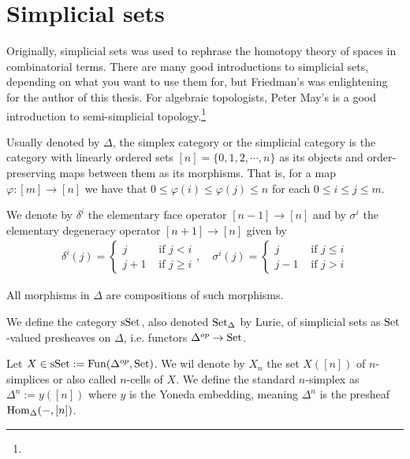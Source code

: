 \documentclass[../../thesis.tex]{subfiles}
\begin{document}
\section{Simplicial sets}
Originally, simplicial sets was used to rephrase the homotopy theory of spaces in combinatorial terms.
There are many good introductions to simplicial sets, depending on what you want to use them for, but Friedman's \cite{friedman2021elementary} was enlightening for the author of this thesis.
For algebraic topologists, Peter May's \cite{MAY} is a good introduction to semi-simplicial topology.\footnote{}
\begin{definition}
    Usually denoted by $\Delta$, the simplex category or the simplicial category is the category with linearly ordered sets $[n]=\{0,1,2,\cdots ,n\}$ as its objects and order-preserving maps between them as its morphisms.
    That is, for a map $\varphi:[m] \to [n]$ we have that $0 \leq \varphi(i)\leq \varphi(j)\leq n$ for each $0 \leq i \leq j \leq m$.
\end{definition}
We denote by $\delta^i$ the elementary face operator $[n-1] \to [n]$ and by $\sigma^i$ the elementary degeneracy operator $[n+1] \to [n]$ given by
\[
    \begin{aligned}
        \delta^i(j) =
        \begin{cases}
            j   & \text{ if } j < i    \\
            j+1 & \text{ if } j \geq i
        \end{cases}, \quad
        \sigma^i(j) =
        \begin{cases}
            j   & \text{ if } j \leq i \\
            j-1 & \text{ if } j > i
        \end{cases}
    \end{aligned}
\]
\begin{remark}
    All morphisms in $\Delta$ are compositions of such morphisms.
\end{remark}
\begin{definition}
    We define the category $\mathrm{sSet}$, also denoted $\mathrm{Set}_{\Delta}$ by Lurie, of simplicial sets as $\mathrm{Set}$-valued presheaves on $\Delta$, i.e. functors $\Delta^{op}\to\mathrm{Set}$.
\end{definition}
Let $X \in \mathrm{sSet} : = \mathrm{Fun}(\Delta^{op}, \mathrm{Set})$. We wil denote by $X_n$ the set $X([n])$ of $n$-simplices or also called $n$-cells of $X$.
We define the standard $n$-simplex as $\Delta^n:=y([n])$ where $y$ is the Yoneda embedding, meaning $\Delta^n$ is the presheaf $\mathrm{Hom}_{\Delta}({-},[n])$.
\end{document}
